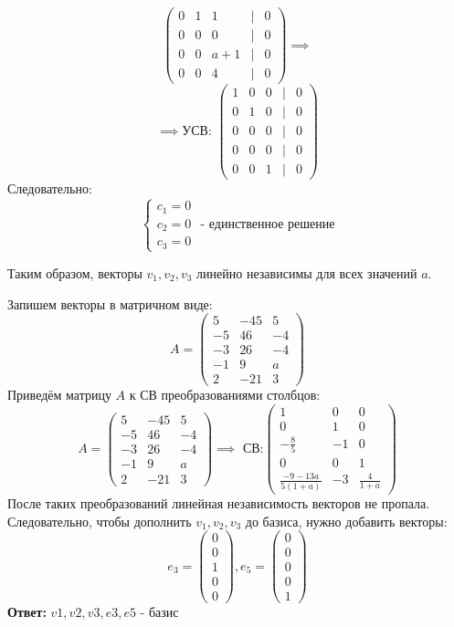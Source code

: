 \documentclass[a4paper]{article}
\newcommand{\mat}[1]{\begin{pmatrix} #1 \end{pmatrix}}
\newcommand{\case}[1]{\begin{cases} #1 \end{cases}}
\begin{document}
\begin{enumerate}
$$\begin{pmatrix}
        0 & 1 & 1 & | & 0 \\
        0 & 0 & 0 & | & 0 \\
        0 & 0 & a + 1 & | & 0 \\
        0 & 0 & 4 & | & 0
        \end{pmatrix}
        \implies$$
    $$\implies \text{УСВ: } \begin{pmatrix}
        1 & 0 & 0 & | & 0 \\
        0 & 1 & 0 & | & 0 \\
        0 & 0 & 0 & | & 0 \\
        0 & 0 & 0 & | & 0 \\
        0 & 0 & 1 & | & 0
        \end{pmatrix}
        $$
    Следовательно:
    $$
    \case{
        c_1 = 0\\
        c_2 = 0\\
        c_3 = 0
    }\text{ - единственное решение}$$

    Таким образом, векторы $ v_1, v_2, v_3 $ линейно независимы для всех значений $ a $.

    Запишем векторы в матричном виде:
    $$A = \mat{5 & -45 & 5\\ -5 & 46 & -4 \\ -3 & 26 & -4\\ -1 & 9 & a\\ 2 & -21 & 3}$$
    Приведём матрицу $A$ к СВ преобразованиями столбцов:
    $$A = \mat{5 & -45 & 5\\ -5 & 46 & -4 \\ -3 & 26 & -4\\ -1 & 9 & a\\ 2 & -21 & 3} \implies \text{ СВ:} \begin{pmatrix}
        1 & 0 & 0 \\
        0 & 1 & 0 \\
        -\frac{8}{5} & -1 & 0 \\
        0 & 0 & 1 \\
        \frac{-9 - 13a}{5(1 + a)} & -3 & \frac{4}{1 + a}
        \end{pmatrix}$$
    После таких преобразований линейная независимость векторов не пропала.
    Следовательно, чтобы дополнить $v_1, v_2, v_3$ до базиса, нужно добавить векторы:
    $$e_3 = \mat{0\\0\\1\\0\\0}, e_5 = \mat{0\\0\\0\\0\\1}$$
    \textbf{Ответ: } $v1, v2, v3, e3, e5$ - базис
    

\end{enumerate}
\end{document}
